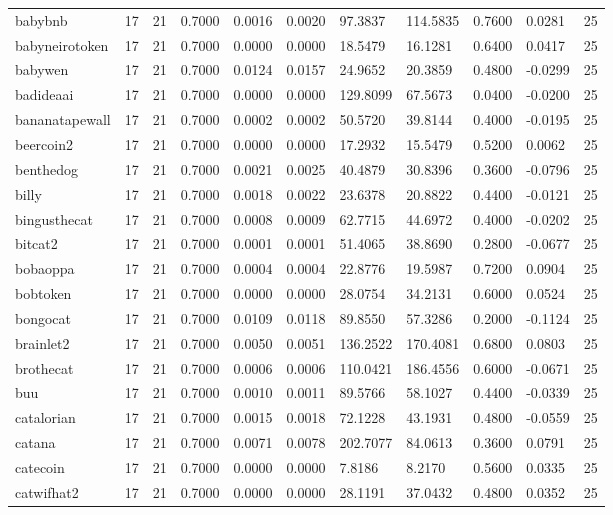\begin{table}[htbp]
\begin{tabular}{lllllllllll}
babybnb & 17 & 21 & 0.7000 & 0.0016 & 0.0020 & 97.3837 & 114.5835 & 0.7600 & 0.0281 & 25 \\
babyneirotoken & 17 & 21 & 0.7000 & 0.0000 & 0.0000 & 18.5479 & 16.1281 & 0.6400 & 0.0417 & 25 \\
babywen & 17 & 21 & 0.7000 & 0.0124 & 0.0157 & 24.9652 & 20.3859 & 0.4800 & -0.0299 & 25 \\
badideaai & 17 & 21 & 0.7000 & 0.0000 & 0.0000 & 129.8099 & 67.5673 & 0.0400 & -0.0200 & 25 \\
bananatapewall & 17 & 21 & 0.7000 & 0.0002 & 0.0002 & 50.5720 & 39.8144 & 0.4000 & -0.0195 & 25 \\
beercoin2 & 17 & 21 & 0.7000 & 0.0000 & 0.0000 & 17.2932 & 15.5479 & 0.5200 & 0.0062 & 25 \\
benthedog & 17 & 21 & 0.7000 & 0.0021 & 0.0025 & 40.4879 & 30.8396 & 0.3600 & -0.0796 & 25 \\
billy & 17 & 21 & 0.7000 & 0.0018 & 0.0022 & 23.6378 & 20.8822 & 0.4400 & -0.0121 & 25 \\
bingusthecat & 17 & 21 & 0.7000 & 0.0008 & 0.0009 & 62.7715 & 44.6972 & 0.4000 & -0.0202 & 25 \\
bitcat2 & 17 & 21 & 0.7000 & 0.0001 & 0.0001 & 51.4065 & 38.8690 & 0.2800 & -0.0677 & 25 \\
bobaoppa & 17 & 21 & 0.7000 & 0.0004 & 0.0004 & 22.8776 & 19.5987 & 0.7200 & 0.0904 & 25 \\
bobtoken & 17 & 21 & 0.7000 & 0.0000 & 0.0000 & 28.0754 & 34.2131 & 0.6000 & 0.0524 & 25 \\
bongocat & 17 & 21 & 0.7000 & 0.0109 & 0.0118 & 89.8550 & 57.3286 & 0.2000 & -0.1124 & 25 \\
brainlet2 & 17 & 21 & 0.7000 & 0.0050 & 0.0051 & 136.2522 & 170.4081 & 0.6800 & 0.0803 & 25 \\
brothecat & 17 & 21 & 0.7000 & 0.0006 & 0.0006 & 110.0421 & 186.4556 & 0.6000 & -0.0671 & 25 \\
buu & 17 & 21 & 0.7000 & 0.0010 & 0.0011 & 89.5766 & 58.1027 & 0.4400 & -0.0339 & 25 \\
catalorian & 17 & 21 & 0.7000 & 0.0015 & 0.0018 & 72.1228 & 43.1931 & 0.4800 & -0.0559 & 25 \\
catana & 17 & 21 & 0.7000 & 0.0071 & 0.0078 & 202.7077 & 84.0613 & 0.3600 & 0.0791 & 25 \\
catecoin & 17 & 21 & 0.7000 & 0.0000 & 0.0000 & 7.8186 & 8.2170 & 0.5600 & 0.0335 & 25 \\
catwifhat2 & 17 & 21 & 0.7000 & 0.0000 & 0.0000 & 28.1191 & 37.0432 & 0.4800 & 0.0352 & 25 \\

\end{tabular}
\end{table}
